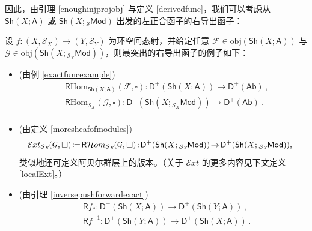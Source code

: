 因此，由引理 \ref{enoughinjprojobj} 与定义 \ref{derivedfunc}，我们可以考虑从 $\mathsf{Sh}(X;\mathsf{A})$ 或 $\mathsf{Sh}(X;{}_\mathcal{S}\mathsf{Mod})$ 出发的左正合函子的右导出函子：

\begin{Ex}
设 $f:(X,\mathcal{S}_X)\rightarrow (Y,\mathcal{S}_Y)$ 为环空间态射，并给定任意 $\mathcal{F}\in\text{obj}(\mathsf{Sh}(X;\mathsf{A}))$ 与 $\mathcal{G}\in\text{obj}(\mathsf{Sh}(X;{}_{\mathcal{S}_X}\!\mathsf{Mod}))$，则最突出的右导出函子的例子如下：
\begin{itemize}[leftmargin=0.5cm]
	\item (由例 \ref{exactfuncexample})
	\begin{equation}
		\begin{aligned}
			&\mathsf{R}\text{Hom}_{\mathsf{Sh}(X;\mathsf{A})}(\mathcal{F},\square):\mathsf{D^+}(\mathsf{Sh}(X;\mathsf{A}))\rightarrow\mathsf{D^+(Ab)}\,, \\ 
			&\mathsf{R}\text{Hom}_{\mathcal{S}_X}(\mathcal{G},\square):\mathsf{D^+}(\mathsf{Sh}(X;{}_{\mathcal{S}_X}\!\mathsf{Mod}))\rightarrow\mathsf{D^+(Ab)}\,. \\
		\end{aligned}
	\end{equation}
	
	\item (由定义 \ref{moresheafofmodules})
	\begin{equation}\label{localExtfunc}\begin{footnotesize}
			\mkern-12mu\mathcal{E}xt_{\mathcal{S}_X}\!(\mathcal{G},\square)\!\coloneqq\!\mathsf{R}\mathcal{H}om_{\mathcal{S}_X}\!(\mathcal{G},\square)\!:\!\mathsf{D^+}(\mathsf{Sh}(X;{}_{\mathcal{S}_X}\!\mathsf{Mod}))\!\rightarrow\!\mathsf{D^+}(\mathsf{Sh}(X;{}_{\mathcal{S}_X}\!\mathsf{Mod})), \\
		\end{footnotesize}
	\end{equation}
	类似地还可定义阿贝尔群层上的版本。（关于 $\mathcal{E}xt$ 的更多内容见下文定义 \ref{localExt}。）
	
	\item (由引理 \ref{inversepushforwardexact})
	\begin{equation}
		\begin{aligned}
			&\mathsf{R}f_*:\mathsf{D^+}(\mathsf{Sh}(X;\mathsf{A}))\rightarrow\mathsf{D^+}(\mathsf{Sh}(Y;\mathsf{A}))\,, \\ &\mathsf{R}f^{-1}:\mathsf{D^+}(\mathsf{Sh}(Y;\mathsf{A}))\rightarrow\mathsf{D^+}(\mathsf{Sh}(X;\mathsf{A}))\,.
		\end{aligned}
	\end{equation}
	

\end{itemize}
\end{Ex}
